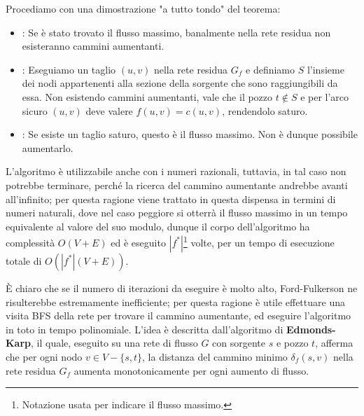 \noindent Procediamo con una dimostrazione "a tutto tondo" del teorema: \begin{itemize}
	\item [$1\implies 2$]: Se è stato trovato il flusso massimo, banalmente nella rete residua non esisteranno cammini aumentanti.
	\item [$2\implies 3$]: Eseguiamo un taglio $(u,v)$ nella rete residua $G_f$ e definiamo $S$ l'insieme dei nodi appartenenti alla sezione della
	sorgente che sono raggiungibili da essa. Non esistendo cammini aumentanti, vale che il pozzo $t\notin S$ e per l'arco sicuro $(u,v)$ deve valere
	$f(u,v) = c(u,v)$, rendendolo saturo.
	\item [$3\implies 1$]: Se esiste un taglio saturo, questo è il flusso massimo. Non è dunque possibile aumentarlo.
\end{itemize}
\noindent L'algoritmo è utilizzabile anche con i numeri razionali, tuttavia, in tal caso non potrebbe terminare, perché la ricerca del cammino
aumentante andrebbe avanti all'infinito; per questa ragione viene trattato in questa dispensa in termini di numeri naturali, dove nel caso peggiore
si otterrà il flusso massimo in un tempo equivalente al valore del suo modulo, dunque il corpo dell'algoritmo ha complessità $O(V+E)$ ed è eseguito
$|f^*|$\footnote{Notazione usata per indicare il flusso massimo.} volte, per un tempo di esecuzione totale di $O(|f^*|(V+E))$.\par
È chiaro che se il numero di iterazioni da eseguire è molto alto, Ford-Fulkerson ne risulterebbe estremamente inefficiente; per questa ragione è utile
effettuare una visita BFS della rete per trovare il cammino aumentante, ed eseguire l'algoritmo in toto in tempo polinomiale. L'idea è descritta
dall'algoritmo di \textbf{Edmonds-Karp}, il quale, eseguito su una rete di flusso $G$ con sorgente $s$ e pozzo $t$, afferma che per ogni nodo
$v\in V - \{s,t\}$, la distanza del cammino minimo $\delta_f(s,v)$ nella rete residua $G_f$ aumenta monotonicamente per ogni aumento di flusso.\newline

